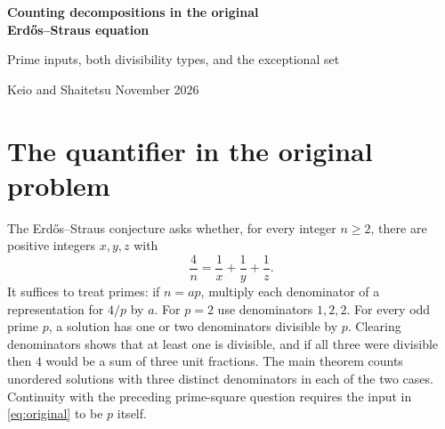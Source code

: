 \documentclass[a4paper,11pt]{article}
\begin{document}
\begin{center}
{\LARGE\bfseries\color{ink}Counting decompositions in the original\\[3pt] Erd\H os--Straus equation\par}
\vspace{6pt}
{\large Prime inputs, both divisibility types, and the exceptional set}\par\vspace{8pt}
Keio and Shaitetsu\quad\textperiodcentered{} November 2026
\end{center}
\begin{abstract}
For almost every prime $p$, the fraction $4/p$ has at least a constant times $(\log p)^2/\log\log p$ unordered decompositions of each of two types into three distinct unit fractions: exactly one denominator or exactly two denominators are divisible by $p$. All these decompositions can be sought with first denominator $x$ satisfying $(\log X)^8<4x-p\le(\log X)^9$, where $X<p\le2X$. For each fixed $A>0$, the exceptional set is $O_A(X/(\log X)^A)$, with the lower-bound constant allowed to depend on $A$. We obtain the bound by constructing divisors with prescribed residues and comparing the first two moments of their counts. It applies even to almost every prime in the thin set where the very first denominator fails. Scaling gives $\gg_A (\log n)^2/(\log\log n)^3$ solutions of each divisibility type for all but $O_A(X/(\log X)^A)$ integer inputs $X<n\le2X$. The universal existence assertion remains open.
\end{abstract}

\section{The quantifier in the original problem}
The Erd\H os--Straus conjecture asks whether, for every integer $n\ge2$, there are positive integers $x,y,z$ with
\begin{equation}\label{eq:original}
 \frac4n=\frac1x+\frac1y+\frac1z .
\end{equation}
It suffices to treat primes: if $n=ap$, multiply each denominator of a representation for $4/p$ by $a$. For $p=2$ use denominators $1,2,2$. For every odd prime $p$, a solution has one or two denominators divisible by $p$. Clearing denominators shows that at least one is divisible, and if all three were divisible then $4$ would be a sum of three unit fractions. The main theorem counts unordered solutions with three distinct denominators in each of the two cases. Continuity with the preceding prime-square question requires the input in \eqref{eq:original} to be $p$ itself.
\end{document}
